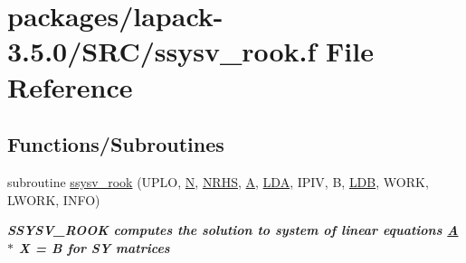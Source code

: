 \hypertarget{ssysv__rook_8f}{}\section{packages/lapack-\/3.5.0/\+S\+R\+C/ssysv\+\_\+rook.f File Reference}
\label{ssysv__rook_8f}
\subsection*{Functions/\+Subroutines}
\begin{DoxyCompactItemize}
\item 
subroutine \hyperlink{group__realSYsolve_ga25369b37d9691172cc8be6020cc3be69}{ssysv\+\_\+rook} (U\+P\+L\+O, \hyperlink{polmisc_8c_a0240ac851181b84ac374872dc5434ee4}{N}, \hyperlink{example__user_8c_aa0138da002ce2a90360df2f521eb3198}{N\+R\+H\+S}, \hyperlink{classA}{A}, \hyperlink{example__user_8c_ae946da542ce0db94dced19b2ecefd1aa}{L\+D\+A}, I\+P\+I\+V, B, \hyperlink{example__user_8c_a50e90a7104df172b5a89a06c47fcca04}{L\+D\+B}, W\+O\+R\+K, L\+W\+O\+R\+K, I\+N\+F\+O)
\begin{DoxyCompactList}\small\item\em {\bfseries  S\+S\+Y\+S\+V\+\_\+\+R\+O\+O\+K computes the solution to system of linear equations \hyperlink{classA}{A} $\ast$ X = B for S\+Y matrices} \end{DoxyCompactList}\end{DoxyCompactItemize}
